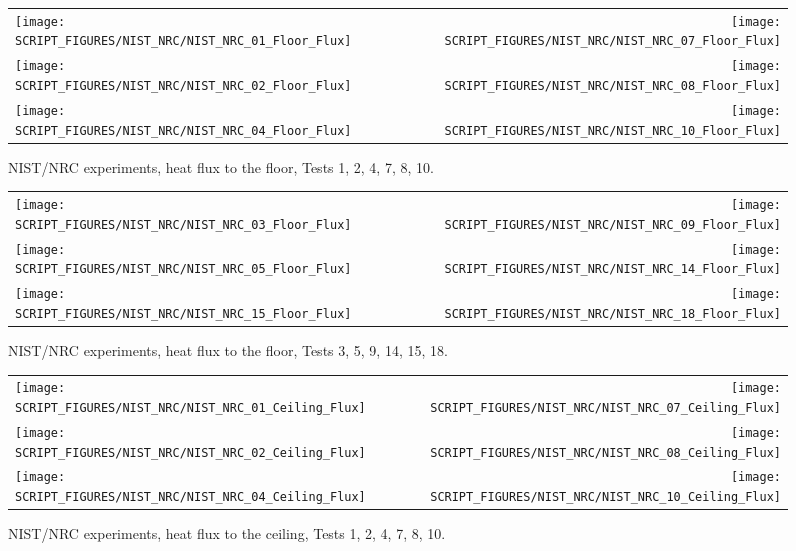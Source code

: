 \begin{figure}[p]
\begin{tabular*}{\textwidth}{l@{\extracolsep{\fill}}r}
\texttt{[image: SCRIPT\_FIGURES/NIST\_NRC/NIST\_NRC\_01\_Floor\_Flux]} &
\texttt{[image: SCRIPT\_FIGURES/NIST\_NRC/NIST\_NRC\_07\_Floor\_Flux]} \\
\texttt{[image: SCRIPT\_FIGURES/NIST\_NRC/NIST\_NRC\_02\_Floor\_Flux]} &
\texttt{[image: SCRIPT\_FIGURES/NIST\_NRC/NIST\_NRC\_08\_Floor\_Flux]} \\
\texttt{[image: SCRIPT\_FIGURES/NIST\_NRC/NIST\_NRC\_04\_Floor\_Flux]} &
\texttt{[image: SCRIPT\_FIGURES/NIST\_NRC/NIST\_NRC\_10\_Floor\_Flux]}
\end{tabular*}
\caption[NIST/NRC experiments, heat flux to the floor, Tests 1, 2, 4, 7, 8, 10]{NIST/NRC experiments, heat flux to the floor, Tests 1, 2, 4, 7, 8, 10.}
\label{NIST_NRC_Floor_Flux_Closed}
\end{figure}

\begin{figure}[p]
\begin{tabular*}{\textwidth}{l@{\extracolsep{\fill}}r}
\texttt{[image: SCRIPT\_FIGURES/NIST\_NRC/NIST\_NRC\_03\_Floor\_Flux]} &
\texttt{[image: SCRIPT\_FIGURES/NIST\_NRC/NIST\_NRC\_09\_Floor\_Flux]} \\
\texttt{[image: SCRIPT\_FIGURES/NIST\_NRC/NIST\_NRC\_05\_Floor\_Flux]} &
\texttt{[image: SCRIPT\_FIGURES/NIST\_NRC/NIST\_NRC\_14\_Floor\_Flux]} \\
\texttt{[image: SCRIPT\_FIGURES/NIST\_NRC/NIST\_NRC\_15\_Floor\_Flux]} &
\texttt{[image: SCRIPT\_FIGURES/NIST\_NRC/NIST\_NRC\_18\_Floor\_Flux]}
\end{tabular*}
\caption[NIST/NRC experiments, heat flux to the floor, Tests 3, 5, 9, 14, 15, 18]{NIST/NRC experiments, heat flux to the floor, Tests 3, 5, 9, 14, 15, 18.}
\label{NIST_NRC_Floor_Flux_Open}
\end{figure}


\begin{figure}[p]
\begin{tabular*}{\textwidth}{l@{\extracolsep{\fill}}r}
\texttt{[image: SCRIPT\_FIGURES/NIST\_NRC/NIST\_NRC\_01\_Ceiling\_Flux]} &
\texttt{[image: SCRIPT\_FIGURES/NIST\_NRC/NIST\_NRC\_07\_Ceiling\_Flux]} \\
\texttt{[image: SCRIPT\_FIGURES/NIST\_NRC/NIST\_NRC\_02\_Ceiling\_Flux]} &
\texttt{[image: SCRIPT\_FIGURES/NIST\_NRC/NIST\_NRC\_08\_Ceiling\_Flux]} \\
\texttt{[image: SCRIPT\_FIGURES/NIST\_NRC/NIST\_NRC\_04\_Ceiling\_Flux]} &
\texttt{[image: SCRIPT\_FIGURES/NIST\_NRC/NIST\_NRC\_10\_Ceiling\_Flux]}
\end{tabular*}
\caption[NIST/NRC experiments, heat flux to the ceiling, Tests 1, 2, 4, 7, 8, 10]{NIST/NRC experiments, heat flux to the ceiling, Tests 1, 2, 4, 7, 8, 10.}
\label{NIST_NRC_Ceiling_Flux_Closed}
\end{figure}

